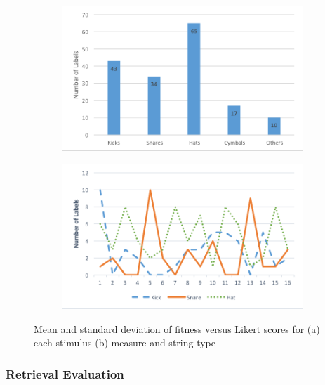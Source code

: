 \begin{figure}
\centering
\begin{subfigure}[b]{0.75\textwidth}
   \includegraphics[width=1\linewidth]{ch07_evaluation/figures/corpus_distribution.png}
   \caption{}
   \label{fig:distrib1} 
\end{subfigure}

\begin{subfigure}[b]{0.75\textwidth}
   \includegraphics[width=1\linewidth]{ch07_evaluation/figures/target_distribution.png}
   \caption{}
   \label{fig:distrib2}
\end{subfigure}

\caption[Two numerical solutions]{Mean and standard deviation of fitness versus Likert scores for (a) each stimulus (b) measure and string type }
\end{figure}

\subsubsection{Retrieval Evaluation}

